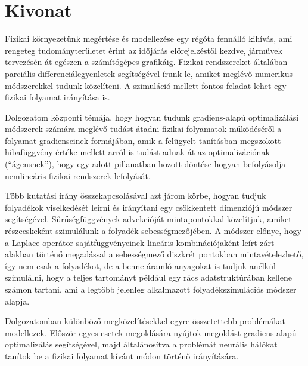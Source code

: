 \setcounter{page}{1}

\selecthungarian

\chapter*{Kivonat}

Fizikai környezetünk megértése és modellezése egy régóta fennálló kihívás, ami
rengeteg tudományterületet érint az időjárás előrejelzéstől kezdve, járművek
tervezésén át egészen a számítógépes grafikáig. Fizikai rendszereket általában
parciális differenciálegyenletek segítségével írunk le, amiket meglévő numerikus
módszerekkel tudunk közelíteni. A szimuláció mellett fontos feladat lehet egy
fizikai folyamat irányítása is.  

Dolgozatom központi témája, hogy hogyan tudunk gradiens-alapú optimalizálási
módszerek számára meglévő tudást átadni fizikai folyamatok működéséről
a folyamat gradienseinek formájában, amik a felügyelt tanításban megszokott
hibafüggvény értéke mellett arról is tudást adnak át az optimalizációnak
(``ágensnek''), hogy egy adott pillanatban hozott döntése hogyan befolyásolja
nemlineáris fizikai rendszerek lefolyását.

Több kutatási irány összekapcsolásával azt járom körbe, hogyan tudjuk folyadékok
viselkedését leírni és irányítani egy csökkentett dimenziójú módszer
segítségével. Sűrűségfüggvények advekcióját mintapontokkal közelítjuk, amiket
részecskeként szimulálunk a folyadék sebességmezőjében. A módszer előnye, hogy
a Laplace-operátor sajátfüggvényeinek lineáris kombinációjaként leírt zárt
alakban történő megadással a sebességmező diszkrét pontokban mintavételezhető,
így nem csak a folyadékot, de a benne áramló anyagokat is tudjuk anélkül
szimulálni, hogy a teljes tartományt például egy rács adatstruktúrában kellene
számon tartani, ami a legtöbb jelenleg alkalmazott folyadékszimulációs módszer
alapja.

Dolgozatomban különböző megközelítésekkel egyre összetettebb problémákat
modellezek. Először egyes esetek megoldására nyújtok megoldást gradiens alapú
optimalizálás segítségével, majd általánosítva a problémát neurális hálókat
tanítok be a fizikai folyamat kívánt módon történő irányítására.

\vfill
\selectenglish

